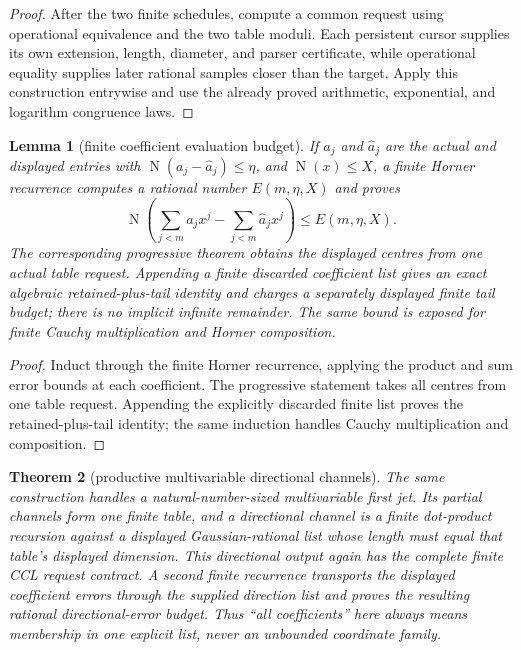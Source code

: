 \documentclass[10pt]{article}
\newtheorem{theorem}{Theorem}[section]
\newtheorem{lemma}[theorem]{Lemma}
\theoremstyle{definition}
\theoremstyle{remark}
\newcommand{\Norm}{\operatorname{N}}
\begin{document}
\begin{proof}
After the two finite schedules, compute a common request using operational
equivalence and the two table moduli.  Each persistent cursor supplies its
own extension, length, diameter, and parser certificate, while operational
equality supplies later rational samples closer than the target.  Apply this
construction entrywise and use the already proved arithmetic, exponential,
and logarithm congruence laws.
\end{proof}

\begin{lemma}[finite coefficient evaluation budget]
If
$a_j$ and $\widehat a_j$ are the actual and displayed entries with
$\Norm(a_j-\widehat a_j)\le\eta$, and $\Norm(x)\le X$, a finite Horner
recurrence computes a rational number $E(m,\eta,X)$ and proves
\[
 \Norm\!\left(\sum_{j<m}a_jx^j-
                    \sum_{j<m}\widehat a_jx^j\right)
 \le E(m,\eta,X).
 \tag{3.31w''}
\]
The corresponding progressive theorem obtains the displayed centres from one
actual table request.  Appending a finite discarded coefficient list gives an
exact algebraic retained-plus-tail identity and charges a separately displayed
finite tail budget; there is no implicit infinite remainder.  The same bound
is exposed for finite Cauchy multiplication and Horner composition.
\end{lemma}

\begin{proof}
Induct through the finite Horner recurrence, applying the product and sum
error bounds at each coefficient.  The progressive statement takes all
centres from one table request.  Appending the explicitly discarded finite
list proves the retained-plus-tail identity; the same induction handles
Cauchy multiplication and composition.
\end{proof}

\begin{theorem}[productive multivariable directional channels]
The same construction handles a natural-number-sized multivariable first
jet.  Its partial channels form one finite table, and a directional channel is
a finite dot-product recursion against a displayed Gaussian-rational list
whose length must equal that table's displayed dimension.  This directional
output again has the complete finite CCL request contract.  A second finite
recurrence transports the displayed coefficient errors through the supplied
direction list and proves the resulting rational directional-error budget.
Thus ``all
coefficients'' here always means membership in one explicit list, never an
unbounded coordinate family.
\end{theorem}
\end{document}
